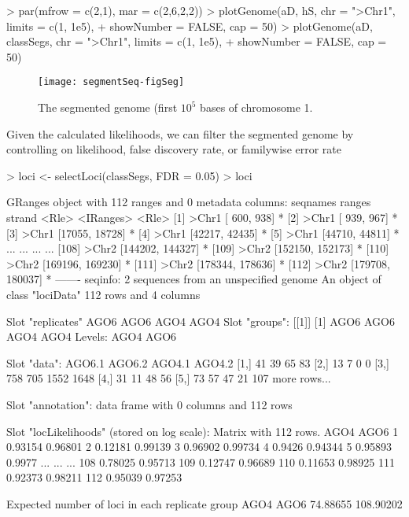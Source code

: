\documentclass[a4paper]{article}
\begin{document}
\begin{Schunk}
\begin{Sinput}
> par(mfrow = c(2,1), mar = c(2,6,2,2))
> plotGenome(aD, hS, chr = ">Chr1", limits = c(1, 1e5),
+            showNumber = FALSE, cap = 50)
> plotGenome(aD, classSegs, chr = ">Chr1", limits = c(1, 1e5),
+            showNumber = FALSE, cap = 50)
\end{Sinput}
\end{Schunk}

\begin{figure}[!ht]
\begin{center}

\texttt{[image: segmentSeq-figSeg]}
\caption{The segmented genome (first $10^5$ bases of chromosome 1.}
\label{fig:Seg}
\end{center}
\end{figure}

Given the calculated likelihoods, we can filter the segmented genome by controlling on likelihood, false discovery rate, or familywise error rate

\begin{Schunk}
\begin{Sinput}
> loci <- selectLoci(classSegs, FDR = 0.05)
> loci
\end{Sinput}
\begin{Soutput}
GRanges object with 112 ranges and 0 metadata columns:
        seqnames           ranges strand
           <Rle>        <IRanges>  <Rle>
    [1]    >Chr1   [  600,   938]      *
    [2]    >Chr1   [  939,   967]      *
    [3]    >Chr1   [17055, 18728]      *
    [4]    >Chr1   [42217, 42435]      *
    [5]    >Chr1   [44710, 44811]      *
    ...      ...              ...    ...
  [108]    >Chr2 [144202, 144327]      *
  [109]    >Chr2 [152150, 152173]      *
  [110]    >Chr2 [169196, 169230]      *
  [111]    >Chr2 [178344, 178636]      *
  [112]    >Chr2 [179708, 180037]      *
  -------
  seqinfo: 2 sequences from an unspecified genome
An object of class "lociData"
112 rows and 4 columns

Slot "replicates"
AGO6 AGO6 AGO4 AGO4
Slot "groups":
[[1]]
[1] AGO6 AGO6 AGO4 AGO4
Levels: AGO4 AGO6


Slot "data":
     AGO6.1 AGO6.2 AGO4.1 AGO4.2
[1,]     41     39     65     83
[2,]     13      7      0      0
[3,]    758    705   1552   1648
[4,]     31     11     48     56
[5,]     73     57     47     21
107 more rows...

Slot "annotation":
data frame with 0 columns and 112 rows

Slot "locLikelihoods" (stored on log scale):
Matrix with  112  rows.
       AGO4    AGO6
1   0.93154 0.96801
2   0.12181 0.99139
3   0.96902 0.99734
4    0.9426 0.94344
5   0.95893  0.9977
...     ...     ...
108 0.78025 0.95713
109 0.12747 0.96689
110 0.11653 0.98925
111 0.92373 0.98211
112 0.95039 0.97253

Expected number of loci in each replicate group
     AGO4      AGO6 
 74.88655 108.90202 
\end{Soutput}
\end{Schunk}
\end{document}
